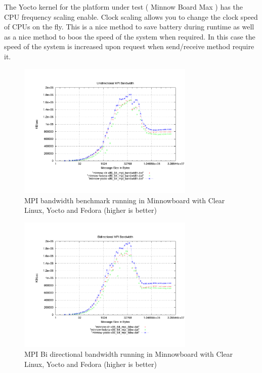 The Yocto kernel for the platform under test ( Minnow Board Max ) has the CPU
frequency scaling enable. Clock scaling allows you to change the clock speed of
CPUs on the fly. This is a nice method to save battery during runtime as well
as a nice method to boos the speed of the system when required. In this case
the speed of the system is increased upon request when send/receive method
require it.

\begin{figure}[H]
\centering
\includegraphics[width=0.75\textwidth]{images/mpbench_yocto_experiments/mpi_bandwidth.pdf}
\caption{MPI bandwidth benchmark running in Minnowboard with Clear Linux,
Yocto and Fedora (higher is better)}
\label{mpi_bandwidth_yocto}
\end{figure}


\begin{figure}[H]
\centering
\includegraphics[width=0.75\textwidth]{images/mpbench_yocto_experiments/mpi_bibw.pdf}
\caption{MPI Bi directional bandwidth running in Minnowboard with Clear Linux,
Yocto and Fedora (higher is better)}
\label{mpi_bibw_yocto}
\end{figure}


